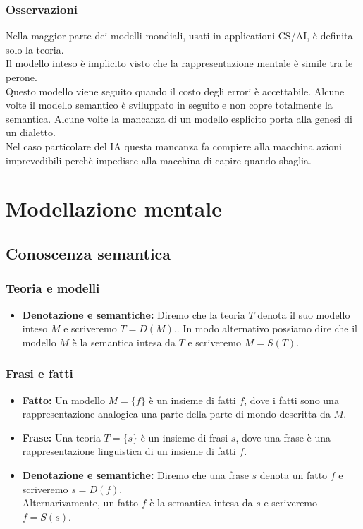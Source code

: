 \documentclass[../main.tex]{subfiles}
\newcommand{\spazio}{\vspace{1em} \newline}
\begin{document}
        \subsection{Osservazioni}
        Nella maggior parte dei modelli mondiali, usati in applicationi CS/AI, è definita solo la teoria.\\
        Il modello inteso è implicito visto che la rappresentazione mentale è simile tra le perone.\\
        Questo modello viene seguito quando il costo degli errori è accettabile.
        \spazio
        Alcune volte il modello semantico è sviluppato in seguito e non copre totalmente la semantica.
        \spazio
        Alcune volte la mancanza di un modello esplicito porta alla genesi di un dialetto.\\
        Nel caso particolare del IA questa mancanza fa compiere alla macchina azioni imprevedibili perchè impedisce alla macchina di capire quando sbaglia.

    \chapter{Modellazione mentale}
    \section{Conoscenza semantica}
    \subsection{Teoria e modelli}
    \begin{itemize}
        \item \textbf{Denotazione e semantiche:} Diremo che la teoria $T$ denota il suo modello inteso $M$ e scriveremo $T=D(M)$..
            In modo alternativo possiamo dire che il modello $M$ è la semantica intesa da $T$ e scriveremo $M=S(T)$.
    \end{itemize}

    \subsection{Frasi e fatti}
    \begin{itemize}
        \item \textbf{Fatto:} Un modello $M=\{f\}$ è un insieme di fatti $f$, dove i fatti sono una rappresentazione analogica una parte della parte di mondo descritta da $M$.
        \item \textbf{Frase:} Una teoria $T=\{s\}$ è un insieme di frasi $s$, dove una frase è una rappresentazione linguistica di un insieme di fatti $f$.
        \item \textbf{Denotazione e semantiche:} Diremo che una frase $s$ denota un fatto $f$ e scriveremo $s=D(f)$.\\
            Alternarivamente, un fatto $f$ è la semantica intesa da $s$ e scriveremo $f=S(s)$.
    \end{itemize}
\end{document}
